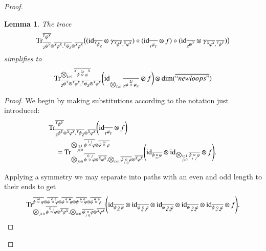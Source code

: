 \documentclass{amsart}
\def\tn{\textnormal}
\def\dim{\tn{dim}}
\def\Trace{\tn{Tr}}
\def\ol{\overline}
\def\id{\tn{id}}
\def\bfe{{\bf e}}
\def\bfo{{\bf o}}
\newcommand{\feeddd}[3]{{\tensor*[^{#2}_{\color{white}{!}}]{{#1}}{^{#3}}}}%
\newcommand{\feeddc}[3]{{\tensor*[^{#2}]{{#1}}{_{#3}}}}
\newcommand{\feedcd}[3]{{\tensor*[_{#2}]{{#1}}{^{#3}}}}
\newcommand{\feedcc}[3]{{\tensor*[^{\color{white}{!}}_{#2}]{{#1}}{_{#3}}}}
\newtheorem{lemma}[subsection]{Lemma}
\theoremstyle{remark}
\theoremstyle{definition}
\begin{document}
\begin{proof}
\begin{lemma}
 The trace
 \[\Trace^{\ol{\feeddd{\psi}{Y}{Y}}}_{\ol{\feedcd{\psi}{Z}{Y}}\otimes\ol{\feeddd{\varphi}{X}{X}},\ol{\feeddc{\psi}{Y}{Z}}\otimes\ol{\feeddd{\varphi}{X}{X}}}
\big(
(\id_{\ol{\feeddc{\psi}{Y}{Z}}}\otimes\gamma_{\ol{\feeddd{\psi}{Y}{Y}},\ol{\feeddd{\varphi}{X}{X}}})\circ(\id_{\ol{\feedcc{\varphi}{Y}{Y}}}\otimes f)\circ(\id_{\ol{\feedcd{\psi}{Z}{Y}}}\otimes\gamma_{\ol{\feeddd{\varphi}{X}{X}},\ol{\feeddd{\psi}{Y}{Y}}})
\big)\]
simplifies to
\[\Trace^{\bigotimes_{k\ge1}\ol{\feeddd{\psi\;\accentset{2k}{\circ}\;\varphi}{X}{X}}
}_{\ol{\feedcd{\psi}{Z}{Y}}\otimes\ol{\feeddd{\varphi}{X}{X}},\ol{\feeddc{\psi}{Y}{Z}}\otimes\ol{\feeddd{\varphi}{X}{X}}}
\bigg(
\id_{\bigotimes_{\ell\ge1}\ol{\feedcc{\psi\;\accentset{2\ell}{\circ}\;\varphi}{Z}{Z}}
}\otimes f
\bigg)\otimes\dim(\ol{``newloops"})\]
\end{lemma}
\begin{proof} 
 We begin by making substitutions according to the notation just introduced:
 \begin{align*}
  &\Trace^{\ol{\feeddd{\psi}{Y}{Y}}}_{\ol{\feedcd{\psi}{Z}{Y}}\otimes\ol{\feeddd{\varphi}{X}{X}},\ol{\feeddc{\psi}{Y}{Z}}\otimes\ol{\feeddd{\varphi}{X}{X}}}
\bigg(\id_{\ol{\feedcc{\varphi}{Y}{Y}}}\otimes f\bigg)\\
  &\quad=\Trace^{\bigotimes_{\substack{\scriptscriptstyle i\ge1\\ \scriptscriptstyle j\ge0}}\ol{\psi\;\accentset{\,i\ j}{\circ}\;\varphi}\otimes\ol{\psi\;\accentset{\infty}{\circ}\;\varphi}}_{\bigotimes_{j\ge0}\ol{\psi\;\accentset{\,0\ j}{\circ}\;\varphi}\otimes\ol{\feeddd{\varphi}{X}{X}},\bigotimes_{i\ge0}\ol{\psi\;\underaccent{\,i\ 0}{\circ}\;\varphi}\otimes\ol{\feeddd{\varphi}{X}{X}}}
\Bigg(\id_{\ol{\psi\,\underaccent{\,\infty}{\circ}\,\varphi}}\otimes\id_{\bigotimes_{\substack{\scriptscriptstyle i\ge1\\ \scriptscriptstyle j\ge0}}\ol{\psi\;\underaccent{\,i\ j}{\circ}\;\varphi}}\otimes f\Bigg).
\end{align*}

Applying a symmetry we may separate into paths with an even and odd length to their ends to get
 \begin{align*}
  \Trace^{\ol{\psi\;\accentset{\infty}{\circ}\;\varphi}\otimes\ol{\psi\;\accentset{\ \bfe\ \bfe}{\circ}\;\varphi}\otimes\ol{\psi\;\accentset{\ \bfe\ \bfo}{\circ}\;\varphi}\otimes\ol{\psi\;\accentset{\ \bfo\ \bfe}{\circ}\;\varphi}\otimes\ol{\psi\;\accentset{\ \bfo\ \bfo}{\circ}\;\varphi}}_{\bigotimes_{j\ge0}\ol{\psi\;\accentset{\,0\ j}{\circ}\;\varphi}\otimes\ol{\feeddd{\varphi}{X}{X}},\bigotimes_{i\ge0}\ol{\psi\;\underaccent{\,i\ 0}{\circ}\;\varphi}\otimes\ol{\feeddd{\varphi}{X}{X}}}
\Bigg(\id_{\ol{\psi\,\underaccent{\,\infty}{\circ}\,\varphi}}\otimes\id_{\ol{\psi\;\underaccent{\,\ \bfe\ \bfe}{\circ}\;\varphi}}\otimes\id_{\ol{\psi\;\underaccent{\,\ \bfe\ \bfo}{\circ}\;\varphi}}\otimes\id_{\ol{\psi\;\underaccent{\,\ \bfo\ \bfe}{\circ}\;\varphi}}\otimes\id_{\ol{\psi\;\underaccent{\,\ \bfo\ \bfo}{\circ}\;\varphi}}\otimes f\Bigg).
\end{align*}


\end{proof}
\end{proof}
\end{document}
